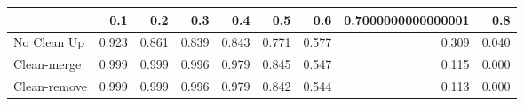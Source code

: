 \begin{tabular}{lrrrrrrrr}
\toprule
{} &   0.1 &   0.2 &   0.3 &   0.4 &   0.5 &   0.6 & 0.7000000000000001 &   0.8 \\
\midrule
No Clean Up  & 0.923 & 0.861 & 0.839 & 0.843 & 0.771 & 0.577 &              0.309 & 0.040 \\
Clean-merge  & 0.999 & 0.999 & 0.996 & 0.979 & 0.845 & 0.547 &              0.115 & 0.000 \\
Clean-remove & 0.999 & 0.999 & 0.996 & 0.979 & 0.842 & 0.544 &              0.113 & 0.000 \\
\bottomrule
\end{tabular}
